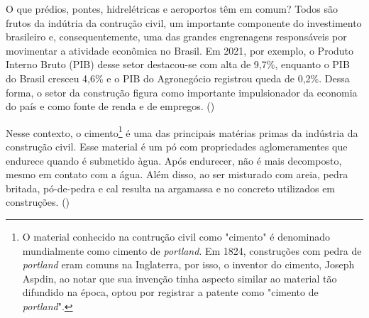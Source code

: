 


\label{cap:introducao}

\enlargethispage{.5\baselineskip}

O que prédios, pontes, hidrelétricas e aeroportos têm em 
comum? Todos são frutos da indútria da contrução civil, 
um importante componente do investimento brasileiro e, 
consequentemente, uma das grandes engrenagens responsáveis 
por movimentar a atividade econômica no Brasil. Em 2021, 
por exemplo, o Produto Interno Bruto (PIB) desse setor 
destacou-se com alta de 9,7\%, enquanto o PIB do Brasil cresceu 
4,6\% e o PIB do Agronegócio registrou queda de 0,2\%. Dessa 
forma, o setor da construção figura como importante 
impulsionador da economia do país e como fonte de renda e de
empregos. (\cite{cbic-report})

Nesse contexto, o cimento\footnote{O material conhecido na contrução 
civil como "cimento" é denominado mundialmente como cimento de 
\textit{portland}. Em 1824, construções com pedra de \textit{portland} eram 
comuns na Inglaterra, por isso, o inventor do cimento, Joseph
Aspdin, ao notar que sua invenção tinha aspecto similar ao 
material tão difundido na época, optou por registrar a patente
como "cimento de \textit{portland}".} é uma das principais matérias
primas da indústria da construção civil. Esse material é 
um pó com propriedades aglomeramentes que endurece quando é 
submetido àgua. Após endurecer, não é 
mais decomposto, mesmo em contato com a água. Além disso,
ao ser misturado com areia, pedra 
britada, pó-de-pedra e cal resulta na argamassa e no 
concreto utilizados em construções. (\cite{boletim-cimento})


